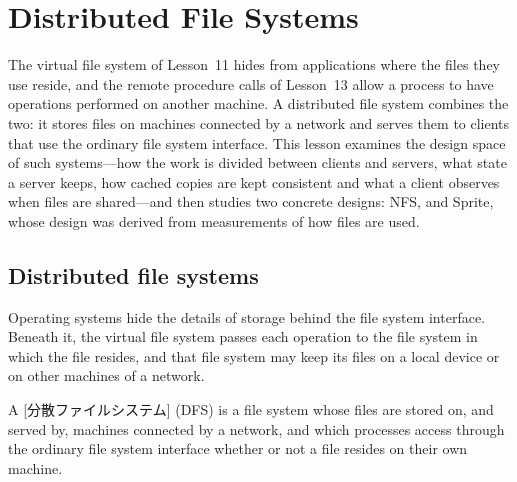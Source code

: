 \documentclass[../main.tex]{subfiles}
\begin{document}
\chapter{Distributed File Systems}

The virtual file system of Lesson~11 hides from applications where the
files they use reside, and the remote procedure calls of Lesson~13 allow a
process to have operations performed on another machine.  A distributed
file system combines the two: it stores files on machines connected by a
network and serves them to clients that use the ordinary file system
interface.  This lesson examines the design space of such systems---how
the work is divided between clients and servers, what state a server
keeps, how cached copies are kept consistent and what a client observes
when files are shared---and then studies two concrete designs: NFS, and
Sprite, whose design was derived from measurements of how files are used.

\section{Distributed file systems}
\label{sec:l14-dfs}

Operating systems hide the details of storage behind the file system
interface.  Beneath
it, the virtual file system passes each operation to the file system in
which the file resides, and that file system may keep its files on a local
device or on other machines of a network.

\begin{definition}
  A [分散ファイルシステム]%
   (DFS) is a file system whose
  files are stored on, and served by, machines connected by a network, and
  which processes access through the ordinary file system interface
  whether or not a file resides on their own machine.
\end{definition}
\end{document}
